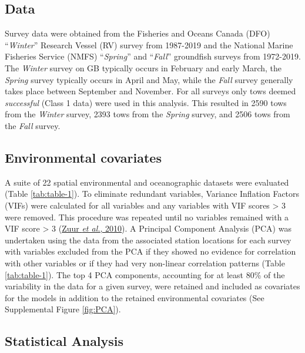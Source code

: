 \documentclass[
]{article}
\begin{document}
\hypertarget{data}{%
\subsection{Data}\label{data}}

Survey data were obtained from the Fisheries and Oceans Canada (DFO) ``\emph{Winter}'' Research Vessel (RV) survey from 1987-2019 and the National Marine Fisheries Service (NMFS) ``\emph{Spring}'' and ``\emph{Fall}'' groundfish surveys from 1972-2019. The \emph{Winter} survey on GB typically occurs in February and early March, the \emph{Spring} survey typically occurs in April and May, while the \emph{Fall} survey generally takes place between September and November. For all surveys only tows deemed \emph{successful} (Class 1 data) were used in this analysis. This resulted in 2590 tows from the \emph{Winter} survey, 2393 tows from the \emph{Spring} survey, and 2506 tows from the \emph{Fall} survey.

\hypertarget{environmental-covariates}{%
\subsection{Environmental covariates}\label{environmental-covariates}}

A suite of 22 spatial environmental and oceanographic datasets were evaluated (Table \ref{tab:table-1}). To eliminate redundant variables, Variance Inflation Factors (VIFs) were calculated for all variables and any variables with VIF scores \textgreater{} 3 were removed. This procedure was repeated until no variables remained with a VIF score \textgreater{} 3 (\protect\hyperlink{ref-zuurProtocolDataExploration2010}{Zuur \emph{et al.}, 2010}). A Principal Component Analysis (PCA) was undertaken using the data from the associated station locations for each survey with variables excluded from the PCA if they showed no evidence for correlation with other variables or if they had very non-linear correlation patterns (Table \ref{tab:table-1}). The top 4 PCA components, accounting for at least 80\% of the variability in the data for a given survey, were retained and included as covariates for the models in addition to the retained environmental covariates (See Supplemental Figure \ref{fig:PCA}).

\hypertarget{statistical-analysis}{%
\subsection{Statistical Analysis}\label{statistical-analysis}}
\end{document}
